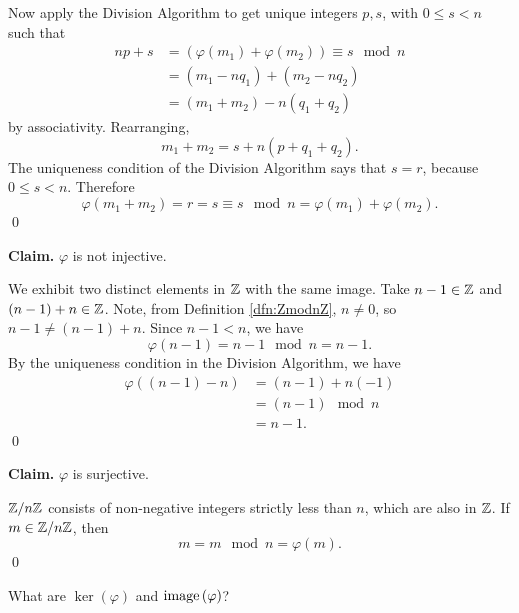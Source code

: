 \documentclass[../algebraNotesMSRI-UP2016.tex]{subfiles}
\begin{document}
\begin{frame}{}{}
Now apply the Division Algorithm to get unique integers $p,s$, with $0\leq s<n$ such that
\begin{align*}
np+s &= \left(\varphi(m_1)+\varphi(m_2)\right)\equiv s\mod n \\
	&= (m_1-nq_1)+(m_2-nq_2) \\
	&= (m_1+m_2)-n(q_1+q_2)
\end{align*}
by associativity.  Rearranging,
\[
m_1+m_2 = s+n(p+q_1+q_2).
\]
The uniqueness condition of the Division Algorithm says that $s=r$, because $0\leq s<n$.  Therefore
\[
\varphi(m_1+m_2)=r=s\equiv s\mod n=\varphi(m_1)+\varphi(m_2).
\]
\qed
\end{frame}

\begin{frame}
\textbf{Claim.} $\varphi$ is not injective.

\smallGap
\pf
We exhibit two distinct elements in $\mathbb Z$ with the same image.  Take $n-1\in\mathbb Z$ and $(n-1)+n\in\mathbb Z$.  Note, from Definition \ref{dfn:ZmodnZ}, $n\neq 0$, so $n-1\neq (n-1)+n$.  Since $n-1<n$, we have
\[
\varphi{(n-1)}=n-1\mod n=n-1.
\]
By the uniqueness condition in the Division Algorithm, we have
\begin{align*}
\varphi{\left((n-1)-n\right)} &= (n-1)+n(-1) \\
	&= (n-1)\mod n \\
	&= n-1.
\end{align*}
\qed
\end{frame}

\begin{frame}[c]
\textbf{Claim.} $\varphi$ is surjective.

\smallGap
\pf
$\mathbb Z/n\mathbb Z$ consists of non-negative integers strictly less than $n$, which are also in $\mathbb Z$.  If $m\in\mathbb Z/n\mathbb Z$, then 
\[
m=m\mod n=\varphi(m).
\]
\qed
\begin{que}
What are $\ker{(\varphi)}$ and $\operatorname{image}{(\varphi)}$?
\end{que}
\end{frame}

\end{document}
